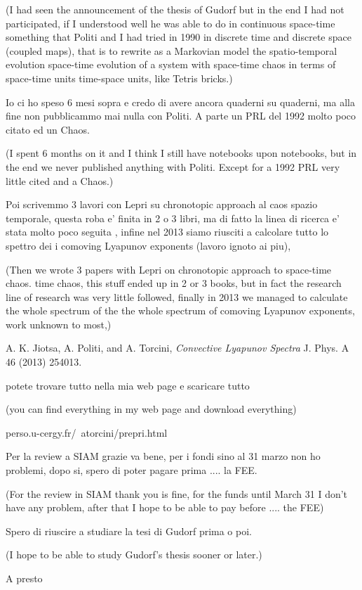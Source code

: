 \begin{description}
(I had seen the announcement of the thesis of Gudorf but in the end I had
not participated, if I understood well he was able to do in continuous
space-time something that Politi and I had tried in 1990 in discrete time
and discrete space (coupled maps), that is to rewrite as a Markovian
model the spatio-temporal evolution space-time evolution of a system with
space-time chaos in terms of space-time units time-space units, like
Tetris bricks.)

Io ci ho speso 6 mesi sopra e credo di avere ancora quaderni su quaderni,
ma alla fine non pubblicammo mai nulla con Politi. A parte un PRL del 1992
molto poco citato ed un Chaos.

(I spent 6 months on it and I think I still have notebooks upon notebooks,
but in the end we never published anything with Politi. Except for a 1992 PRL
very little cited and a Chaos.)

Poi scrivemmo 3 lavori con Lepri su chronotopic approach al caos spazio
temporale, questa roba e' finita in 2 o 3 libri, ma di fatto la linea di
ricerca e' stata molto poco seguita , infine nel 2013 siamo riusciti a
calcolare tutto lo spettro dei i comoving Lyapunov exponents (lavoro
ignoto ai piu),

(Then we wrote 3 papers with Lepri on chronotopic approach to space-time
chaos. time chaos, this stuff ended up in 2 or 3 books, but in fact the
research line of research was very little followed, finally in 2013 we
managed to calculate the whole spectrum of the the whole spectrum of
comoving Lyapunov exponents, work unknown to most,)

A. K. Jiotsa, A. Politi, and A. Torcini, {\em Convective Lyapunov Spectra}
J. Phys. A 46 (2013) 254013.


potete trovare tutto nella mia web page e scaricare tutto

(you can find everything in my web page and download everything)

{perso.u-cergy.fr/~atorcini/prepri.html}

Per la review  a SIAM grazie va bene, per i fondi sino al 31 marzo non ho
problemi, dopo si, spero di poter pagare prima .... la FEE.

(For the review in SIAM thank you is fine, for the funds until March 31 I
don't have any problem, after that I hope to be able to pay before ....
the FEE)

Spero di riuscire a studiare la tesi di Gudorf prima o poi.

(I hope to be able to study Gudorf's thesis sooner or later.)

A presto


\end{description}


